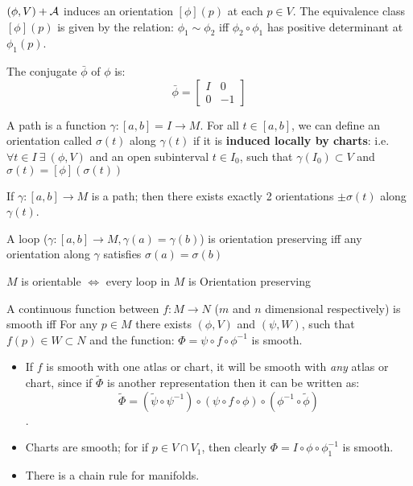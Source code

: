 \begin{ddef}
$(\phi,V) + \mathcal{A}$ induces an orientation $[\phi](p)$ at each $p\in V$. The equivalence class $[\phi](p)$ is given by the relation: $\phi_1 \sim \phi_2$ iff $\phi_2 \circ \phi_1$ has positive determinant at $\phi_1(p)$.
\end{ddef}

\begin{ddef}
The conjugate $\bar \phi$ of $\phi$ is: $$\bar \phi = \begin{bmatrix} I & 0 \\ 0 & -1 \end{bmatrix}$$ 
\end{ddef}

\begin{ddef}[Paths]
A path is a function $\gamma: [a,b] =I \to M$. For all $t\in [a,b]$, we can define an orientation called $\sigma(t)$ 
along $\gamma(t)$ if it is \textbf{induced locally by charts}: i.e.  $\forall t\in I \ \exists \ (\phi,V)$ and an open subinterval $t\in I_0$, such that $\gamma(I_0)\subset V$ and $\sigma(t)=[\phi](\sigma(t))$    
\end{ddef}

\begin{teorema}
If $\gamma:[a,b]\to M$ is a path; then there exists exactly 2 orientations $\pm \sigma(t)$ along $\gamma(t)$.
\end{teorema}

\begin{ddef}
A loop ($\gamma:[a,b]\to M, \gamma(a) = \gamma(b)$) is orientation preserving iff any orientation along $\gamma$ satisfies $\sigma(a)=\sigma(b)$
\end{ddef}

\begin{teorema}
$M$ is orientable $\iff$ every loop in $M$ is Orientation preserving
\end{teorema}

\begin{ddef}
A continuous function between $f: M \to N$ ($m$ and $n$ dimensional respectively) is smooth iff For any $p\in M$ there exists $(\phi,V)$ and $(\psi,W)$, such that $f(p)\in W\subset N$ and the function: $ \Phi = \psi \circ f \circ \phi^{-1} $ is smooth.
\end{ddef}

\begin{remarks}
\begin{itemize}
\item If $f$ is smooth with one atlas or chart, it will be smooth with \emph{any} atlas or chart, since if $\tilde \Phi$ is another representation then it can be written as: $$\tilde \Phi = (\tilde \psi \circ \psi^{-1})\circ (\psi \circ f \circ \phi)\circ (\phi^{-1}\circ \tilde\phi)$$.
\item Charts are smooth; for if $p\in V\cap V_1$, then clearly $\Phi = I \circ \phi \circ \phi_1^{-1}$ is smooth.
\item There is a chain rule for manifolds.
\end{itemize}
\end{remarks}

